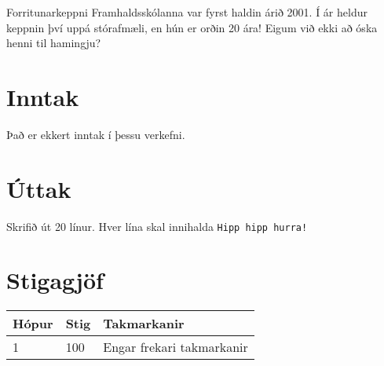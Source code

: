 Forritunarkeppni Framhaldsskólanna var fyrst haldin árið 2001. Í ár heldur
keppnin því uppá stórafmæli, en hún er orðin 20 ára! Eigum við ekki að óska
henni til hamingju?

\section*{Inntak}
Það er ekkert inntak í þessu verkefni.

\section*{Úttak}
Skrifið út 20 línur. Hver lína skal innihalda \texttt{Hipp hipp hurra!}

\section*{Stigagjöf}
\begin{tabular}{|l|l|l|}
\hline
Hópur & Stig & Takmarkanir \\ \hline
1     & 100  & Engar frekari takmarkanir\\ \hline
\end{tabular}
